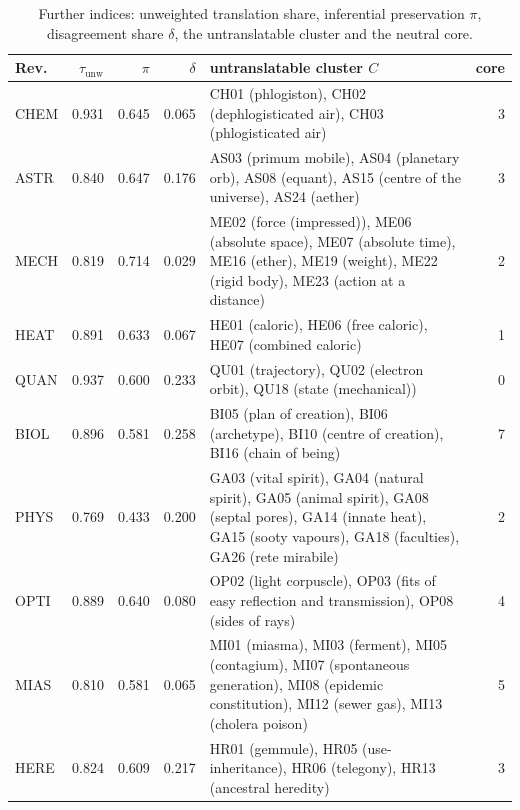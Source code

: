 \begin{table}[!htb]\centering\footnotesize
\caption{Further indices: unweighted translation share, inferential preservation $\pi$, disagreement share $\delta$, the untranslatable cluster and the neutral core.}\label{tab:further}
\begin{tabular}{@{}lrrrp{6.2cm}r@{}}\toprule
Rev. & $\tau_{\mathrm{unw}}$ & $\pi$ & $\delta$ & untranslatable cluster $C$ & core\\\midrule
CHEM & 0.931 & 0.645 & 0.065 & CH01 (phlogiston), CH02 (dephlogisticated air), CH03 (phlogisticated air) & 3\\
ASTR & 0.840 & 0.647 & 0.176 & AS03 (primum mobile), AS04 (planetary orb), AS08 (equant), AS15 (centre of the universe), AS24 (aether) & 3\\
MECH & 0.819 & 0.714 & 0.029 & ME02 (force (impressed)), ME06 (absolute space), ME07 (absolute time), ME16 (ether), ME19 (weight), ME22 (rigid body), ME23 (action at a distance) & 2\\
HEAT & 0.891 & 0.633 & 0.067 & HE01 (caloric), HE06 (free caloric), HE07 (combined caloric) & 1\\
QUAN & 0.937 & 0.600 & 0.233 & QU01 (trajectory), QU02 (electron orbit), QU18 (state (mechanical)) & 0\\
BIOL & 0.896 & 0.581 & 0.258 & BI05 (plan of creation), BI06 (archetype), BI10 (centre of creation), BI16 (chain of being) & 7\\
PHYS & 0.769 & 0.433 & 0.200 & GA03 (vital spirit), GA04 (natural spirit), GA05 (animal spirit), GA08 (septal pores), GA14 (innate heat), GA15 (sooty vapours), GA18 (faculties), GA26 (rete mirabile) & 2\\
OPTI & 0.889 & 0.640 & 0.080 & OP02 (light corpuscle), OP03 (fits of easy reflection and transmission), OP08 (sides of rays) & 4\\
MIAS & 0.810 & 0.581 & 0.065 & MI01 (miasma), MI03 (ferment), MI05 (contagium), MI07 (spontaneous generation), MI08 (epidemic constitution), MI12 (sewer gas), MI13 (cholera poison) & 5\\
HERE & 0.824 & 0.609 & 0.217 & HR01 (gemmule), HR05 (use-inheritance), HR06 (telegony), HR13 (ancestral heredity) & 3\\
\bottomrule\end{tabular}\end{table}

